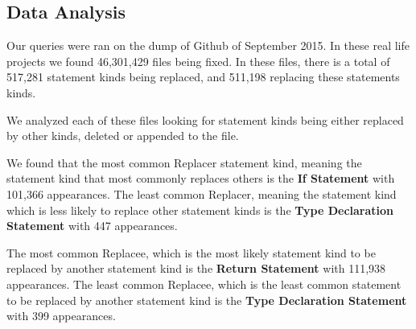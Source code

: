 \documentclass{sig-alternate-05-2015}
\begin{document}


\subsection{Data Analysis}
Our queries were ran on the dump of Github of September 2015. In these real life projects we found 46,301,429 files being fixed. In these files, there is a total of 517,281 statement kinds being replaced, and 511,198 replacing these statements kinds.

We analyzed each of these files looking for statement kinds being either replaced by other kinds, deleted or appended to the file.

We found that the most common Replacer statement kind, meaning the statement kind that most commonly replaces others is the \textbf{If Statement} with 101,366 appearances. The least common Replacer, meaning the statement kind which is less likely to replace other statement kinds is the \textbf{Type Declaration Statement} with 447 appearances.

The most common Replacee, which is the most likely statement kind to be replaced by another statement kind is the \textbf{Return Statement} with 111,938 appearances. The least common Replacee, which is the least common statement to be replaced by another statement kind is the \textbf{Type Declaration Statement} with 399 appearances.
\end{document}
